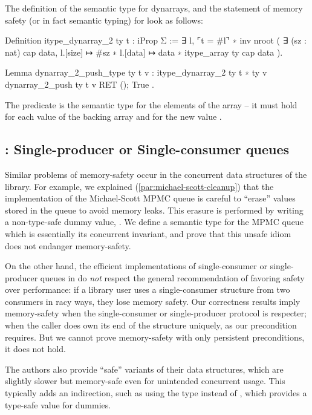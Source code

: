 The definition of the semantic type for dynarrays, and the statement of memory safety (or in fact semantic typing) for  look as follows:
\begin{coqcode}
Definition itype_dynarray_2 ty t : iProp Σ :=
  ∃ l,
  ⌜t = #l⌝ ∗
  inv nroot (
    ∃ (sz : nat) cap data,
    l.[size] ↦ #sz ∗
    l.[data] ↦ data ∗ itype_array ty cap data
  ).

Lemma dynarray_2_push_type ty t v :
  {{{ itype_dynarray_2 ty t ∗ ty v }}}
    dynarray_2_push ty t v
  {{{ RET (); True }}}.
\end{coqcode}

The predicate  is the semantic type for the elements of the array -- it must hold for each value of the backing array and for the new value .


\subsection{\Saturn: Single-producer or Single-consumer queues}

Similar problems of memory-safety occur in the concurrent data structures of the \Saturn library. For example, we explained (\cref{par:michael-scott-cleanup}) that the \Saturn implementation of the Michael-Scott MPMC queue is careful to ``erase'' values stored in the queue to avoid memory leaks. This erasure is performed by writing a non-type-safe dummy value, . We define a semantic type for the MPMC queue which is essentially its concurrent invariant, and prove that this unsafe idiom does not endanger memory-safety.

On the other hand, the efficient implementations of single-consumer or single-producer queues in \Saturn do \emph{not} respect the general \OCaml recommendation of favoring safety over performance: if a library user uses a single-consumer structure from two consumers in racy ways, they lose memory safety. Our correctness results imply memory-safety when the single-consumer or single-producer protocol is respecter; when the caller does own its end of the structure uniquely, as our precondition requires. But we cannot prove memory-safety with only persistent preconditions, it does not hold.

The \Saturn authors also provide ``safe'' variants of their data structures, which are slightly slower but memory-safe even for unintended concurrent usage. This typically adds an indirection, such as using the type  instead of , which provides a type-safe  value for dummies.

